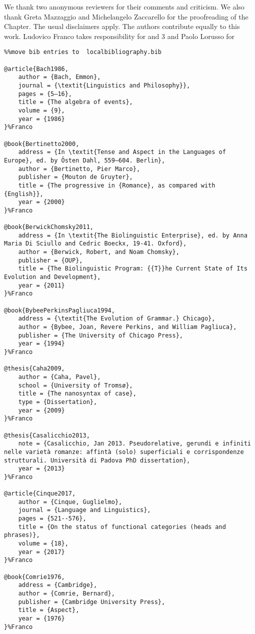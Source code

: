 \documentclass[output=paper,colorlinks,citecolor=brown]{./langscibook}
\begin{document}
We thank two anonymous reviewers for their comments and criticism. We also thank Greta Mazzaggio and Michelangelo Zaccarello for the proofreading of the Chapter. The usual disclaimers apply.  The authors contribute equally to this work. Ludovico Franco takes responsibility for  and 3 and Paolo Lorusso for 

\begin{verbatim}%%move bib entries to  localbibliography.bib

@article{Bach1986,
	author = {Bach, Emmon},
	journal = {\textit{Linguistics and Philosophy}},
	pages = {5–16},
	title = {The algebra of events},
	volume = {9},
	year = {1986}
}%Franco

@book{Bertinetto2000,
	address = {In \textit{Tense and Aspect in the Languages of Europe}, ed. by Östen Dahl, 559–604. Berlin},
	author = {Bertinetto, Pier Marco},
	publisher = {Mouton de Gruyter},
	title = {The progressive in {Romance}, as compared with {English}},
	year = {2000}
}%Franco

@book{BerwickChomsky2011,
	address = {In \textit{The Biolinguistic Enterprise}, ed. by Anna Maria Di Sciullo and Cedric Boeckx, 19-41. Oxford},
	author = {Berwick, Robert, and Noam Chomsky},
	publisher = {OUP},
	title = {The Biolinguistic Program: {{T}}he Current State of Its Evolution and Development},
	year = {2011}
}%Franco

@book{BybeePerkinsPagliuca1994,
	address = {\textit{The Evolution of Grammar.} Chicago},
	author = {Bybee, Joan, Revere Perkins, and William Pagliuca},
	publisher = {The University of Chicago Press},
	year = {1994}
}%Franco

@thesis{Caha2009,
	author = {Caha, Pavel},
	school = {University of Tromsø},
	title = {The nanosyntax of case},
	type = {Dissertation},
	year = {2009}
}%Franco

@thesis{Casalicchio2013,
    note = {Casalicchio, Jan 2013. Pseudorelative, gerundi e infiniti nelle varietà romanze: affintà (solo) superficiali e corrispondenze strutturali. Università di Padova PhD dissertation},
    year = {2013}
}%Franco

@article{Cinque2017,
	author = {Cinque, Guglielmo},
	journal = {Language and Linguistics},
	pages = {521--576},
	title = {On the status of functional categories (heads and phrases)},
	volume = {18},
	year = {2017}
}%Franco

@book{Comrie1976,
	address = {Cambridge},
	author = {Comrie, Bernard},
	publisher = {Cambridge University Press},
	title = {Aspect},
	year = {1976}
}%Franco


\end{verbatim}
\end{document}
